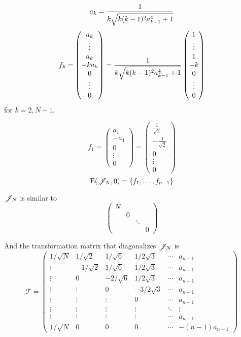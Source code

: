 \documentclass{article}
\begin{document}
\begin{propose}
    \[a_k = \frac{1}{k\sqrt{k(k-1)^2 a_{k-1}^4 + 1}}\]
    \[f_k =
    \begin{pmatrix}a_k \\ \vdots \\ a_k \\ -ka_k \\ 0 \\ \vdots \\ 0 \end{pmatrix} =
    \frac{1}{k\sqrt{k(k-1)^2 a_{k-1}^4 + 1}}
    \begin{pmatrix}1 \\ \vdots \\ 1 \\ -k \\ 0 \\ \vdots \\ 0 \end{pmatrix}\]
        for \( k=\overline{2,N-1} \).

    \[f_1
    = \begin{pmatrix}a_1 \\ -a_1 \\ 0 \\ \vdots \\ 0 \end{pmatrix}
        = \begin{pmatrix}\frac1{\sqrt2} \\ - \frac{1}{\sqrt2} \\ 0 \\ \vdots \\ 0 \end{pmatrix}
            \]
    \[\mathrm{E}({\mathscr{J}_{N}}, {0}) = \{ f_1, \ldots, f_{n-1} \}\]

    \( \mathscr{J}_{N} \) is similar to
    \[\begin{pmatrix}
        N &   &        & \\
        & 0 &        & \\
        &   & \ddots & \\
        &   &        & 0
    \end{pmatrix}\]

    And the transformation matrix that diagonalizes \( \mathscr{J}_{N} \) is
    \[\mathcal T =
    \begin{pmatrix}
        1/\sqrt N &  1/\sqrt2 & 1/\sqrt6  & 1/2\sqrt3  & \cdots & a_{n-1} \\
        \vdots    & -1/\sqrt2 & 1/\sqrt6  & 1/2\sqrt3  & \cdots & a_{n-1} \\
        \vdots    & 0         & -2/\sqrt6 & 1/2\sqrt3  & \cdots & a_{n-1} \\
        \vdots    & \vdots    & 0         & -3/2\sqrt3 & \cdots & a_{n-1} \\
        \vdots    & \vdots    & \vdots    & 0          & \cdots & a_{n-1} \\
        \vdots    & \vdots    & \vdots    & \vdots     & \ddots & \vdots  \\
        \vdots    & \vdots    & \vdots    & \vdots     & \cdots & a_{n-1} \\
        1/\sqrt N & 0         & 0         & 0          & \cdots & -(n-1)a_{n-1}
    \end{pmatrix}\]


\end{propose}
\end{document}
